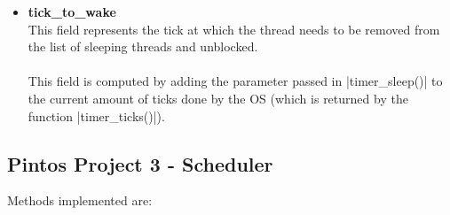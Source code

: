 \documentclass{article}
\begin{document}
\begin{itemize}
	\item \textbf{tick\_to\_wake}
	\vspace{.2cm} \\
	This field represents the tick at which the thread needs to be removed from the list of sleeping threads and unblocked. \\ \\
	This field is computed by adding the parameter passed in \cverb|timer_sleep()| to the current amount of ticks done by the OS (which is returned by the function \cverb|timer_ticks()|).
\end{itemize}

\subsection{Pintos Project 3 - Scheduler}
Methods implemented are:
\end{document}

